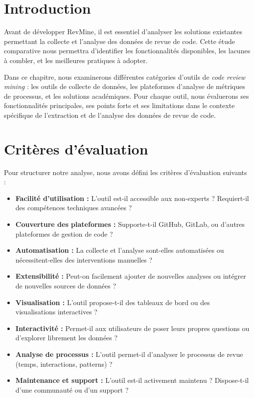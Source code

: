 \section{Introduction}

Avant de développer RevMine, il est essentiel d'analyser les solutions existantes permettant la collecte et l'analyse des données de revue de code. Cette étude comparative nous permettra d'identifier les fonctionnalités disponibles, les lacunes à combler, et les meilleures pratiques à adopter.

Dans ce chapitre, nous examinerons différentes catégories d'outils de \textit{code review mining} : les outils de collecte de données, les plateformes d'analyse de métriques de processus, et les solutions académiques. Pour chaque outil, nous évaluerons ses fonctionnalités principales, ses points forts et ses limitations dans le contexte spécifique de l'extraction et de l'analyse des données de revue de code.

\section{Critères d'évaluation}

Pour structurer notre analyse, nous avons défini les critères d'évaluation suivants :

\begin{itemize}
    \item \textbf{Facilité d'utilisation :} L'outil est-il accessible aux non-experts ? Requiert-il des compétences techniques avancées ?
    \item \textbf{Couverture des plateformes :} Supporte-t-il GitHub, GitLab, ou d'autres plateformes de gestion de code ?
    \item \textbf{Automatisation :} La collecte et l'analyse sont-elles automatisées ou nécessitent-elles des interventions manuelles ?
    \item \textbf{Extensibilité :} Peut-on facilement ajouter de nouvelles analyses ou intégrer de nouvelles sources de données ?
    \item \textbf{Visualisation :} L'outil propose-t-il des tableaux de bord ou des visualisations interactives ?
    \item \textbf{Interactivité :} Permet-il aux utilisateurs de poser leurs propres questions ou d'explorer librement les données ?
    \item \textbf{Analyse de processus :} L'outil permet-il d'analyser le processus de revue (temps, interactions, patterns) ?
    \item \textbf{Maintenance et support :} L'outil est-il activement maintenu ? Dispose-t-il d'une communauté ou d'un support ?
\end{itemize}

